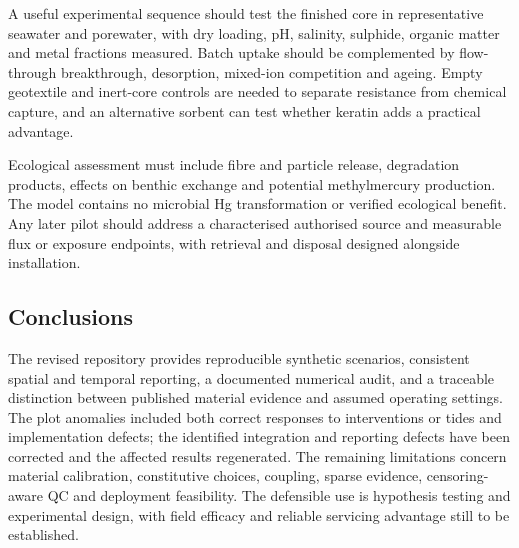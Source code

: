A useful experimental sequence should test the finished core in representative seawater and porewater, with dry loading, pH, salinity, sulphide, organic matter and metal fractions measured. Batch uptake should be complemented by flow-through breakthrough, desorption, mixed-ion competition and ageing. Empty geotextile and inert-core controls are needed to separate resistance from chemical capture, and an alternative sorbent can test whether keratin adds a practical advantage.

Ecological assessment must include fibre and particle release, degradation products, effects on benthic exchange and potential methylmercury production. The model contains no microbial Hg transformation or verified ecological benefit. Any later pilot should address a characterised authorised source and measurable flux or exposure endpoints, with retrieval and disposal designed alongside installation.

\subsection{Conclusions}
The revised repository provides reproducible synthetic scenarios, consistent spatial and temporal reporting, a documented numerical audit, and a traceable distinction between published material evidence and assumed operating settings. The plot anomalies included both correct responses to interventions or tides and implementation defects; the identified integration and reporting defects have been corrected and the affected results regenerated. The remaining limitations concern material calibration, constitutive choices, coupling, sparse evidence, censoring-aware QC and deployment feasibility. The defensible use is hypothesis testing and experimental design, with field efficacy and reliable servicing advantage still to be established.
